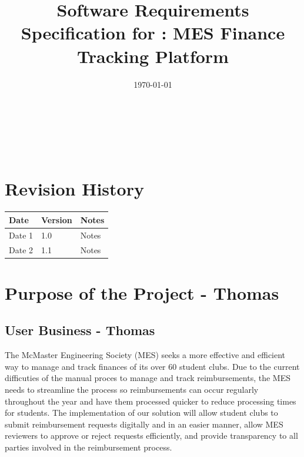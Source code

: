 \documentclass[12pt]{article}
\begin{document}
\title{Software Requirements Specification for \progname: MES Finance Tracking Platform} 
\author{\authname}
\date{\today}
	
\maketitle

~\newpage


\tableofcontents

~\newpage

\section*{Revision History}

\begin{tabularx}{\textwidth}{p{3cm}p{2cm}X}
  \toprule {\bf Date} & {\bf Version} & {\bf Notes}\\
    \midrule
      Date 1 & 1.0 & Notes\\
      Date 2 & 1.1 & Notes\\
  \bottomrule
\end{tabularx}

\newpage
{}


\section{Purpose of the Project - Thomas}
  \subsection{User Business - Thomas}
    The McMaster Engineering Society (MES) seeks a more effective and efficient way to manage and track finances of its over 60 student clubs. Due to the current difficuties of 
    the manual proces to manage and track reimbursements, the MES needs to streamline the process so reimbursements can occur regularly throughout the year and have them processed
    quicker to reduce processing times for students. The implementation of our solution will allow student clubs to submit reimbursement requests digitally and in an easier manner, 
    allow MES reviewers to approve or reject requests efficiently, and provide transparency to all parties involved in the reimbursement process. 
\end{document}

